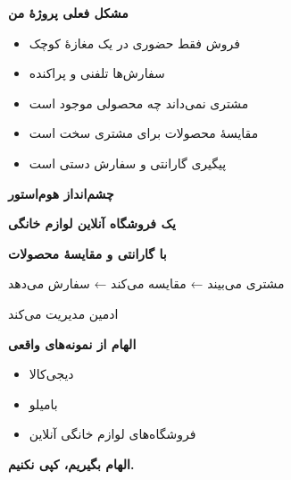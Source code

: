 \documentclass[14pt, a4paper, landscape]{extarticle}
\newcommand{\slide}[1]{%
    \newpage
    \begin{center}
    \begin{minipage}[t]{0.95\textwidth}
    \vspace{0.5cm}
    #1
    \vspace{0.5cm}
    \end{minipage}
    \end{center}
}
\newcommand{\slidetitle}[1]{%
    \begin{center}
        {\LARGE\bfseries\textcolor{primary}{#1}}
    \end{center}
    \vspace{0.5cm}
}
\newcommand{\myaccent}[1]{\textcolor{accent}{#1}}
\begin{document}
\slide{
    \slidetitle{مشکل فعلی پروژهٔ من}
    \vspace{0.5cm}
    \begin{itemize}[itemsep=0.6em]
        \item فروش فقط حضوری در یک مغازهٔ کوچک
        \item سفارش‌ها تلفنی و پراکنده
        \item مشتری نمی‌داند چه محصولی موجود است
        \item مقایسهٔ محصولات برای مشتری سخت است
        \item پیگیری گارانتی و سفارش دستی است
    \end{itemize}
}

\slide{
    \slidetitle{چشم‌انداز هوم‌استور}
    \vspace{1cm}
    \begin{center}
        {\Large\bfseries یک فروشگاه آنلاین لوازم خانگی}
        
        {\Large\bfseries با گارانتی و مقایسهٔ محصولات}
        
        \vspace{2cm}
        
        {\large مشتری می‌بیند ← مقایسه می‌کند ← سفارش می‌دهد}
        
        \vspace{0.5cm}
        
        {\large ادمین مدیریت می‌کند}
    \end{center}
}

\slide{
    \slidetitle{الهام از نمونه‌های واقعی}
    \vspace{1cm}
    \begin{itemize}[itemsep=0.8em]
        \item {\Large دیجی‌کالا}
        \item {\Large بامیلو}
        \item {\Large فروشگاه‌های لوازم خانگی آنلاین}
    \end{itemize}
    
    \vspace{1.5cm}
    
    \begin{center}
        {\Large\bfseries\myaccent{الهام بگیریم، کپی نکنیم.}}
    \end{center}
}
\end{document}
